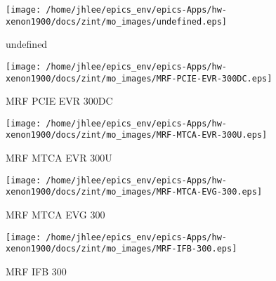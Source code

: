 \noindent
\vspace{1.4cm}
\begin{minipage}{.2\textwidth}
\begin{center}
\texttt{[image: /home/jhlee/epics\_env/epics-Apps/hw-xenon1900/docs/zint/mo\_images/undefined.eps]}
\end{center}
\end{minipage}
\begin{minipage}{.7\textwidth}
undefined
\end{minipage}


\noindent
\vspace{1.4cm}
\begin{minipage}{.2\textwidth}
\begin{center}
\texttt{[image: /home/jhlee/epics\_env/epics-Apps/hw-xenon1900/docs/zint/mo\_images/MRF-PCIE-EVR-300DC.eps]}
\end{center}
\end{minipage}
\begin{minipage}{.7\textwidth}
MRF PCIE EVR 300DC
\end{minipage}


\noindent
\vspace{1.4cm}
\begin{minipage}{.2\textwidth}
\begin{center}
\texttt{[image: /home/jhlee/epics\_env/epics-Apps/hw-xenon1900/docs/zint/mo\_images/MRF-MTCA-EVR-300U.eps]}
\end{center}
\end{minipage}
\begin{minipage}{.7\textwidth}
MRF MTCA EVR 300U
\end{minipage}


\noindent
\vspace{1.4cm}
\begin{minipage}{.2\textwidth}
\begin{center}
\texttt{[image: /home/jhlee/epics\_env/epics-Apps/hw-xenon1900/docs/zint/mo\_images/MRF-MTCA-EVG-300.eps]}
\end{center}
\end{minipage}
\begin{minipage}{.7\textwidth}
MRF MTCA EVG 300
\end{minipage}


\noindent
\vspace{1.4cm}
\begin{minipage}{.2\textwidth}
\begin{center}
\texttt{[image: /home/jhlee/epics\_env/epics-Apps/hw-xenon1900/docs/zint/mo\_images/MRF-IFB-300.eps]}
\end{center}
\end{minipage}
\begin{minipage}{.7\textwidth}
MRF IFB 300
\end{minipage}


